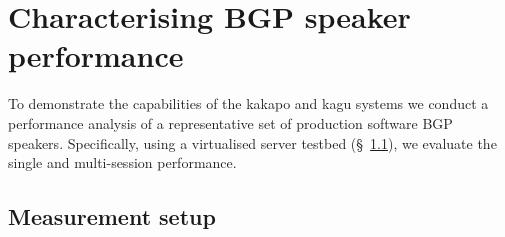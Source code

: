 





\section{Characterising BGP speaker performance}\label{sec:result}

To demonstrate the capabilities of the kakapo and kagu systems we conduct
a performance analysis of a representative set of production software BGP speakers.
Specifically, using a virtualised server testbed (\S~\ref{sec:testbed}), we evaluate the
single and multi-session performance.

\subsection{Measurement setup}\label{sec:testbed}

